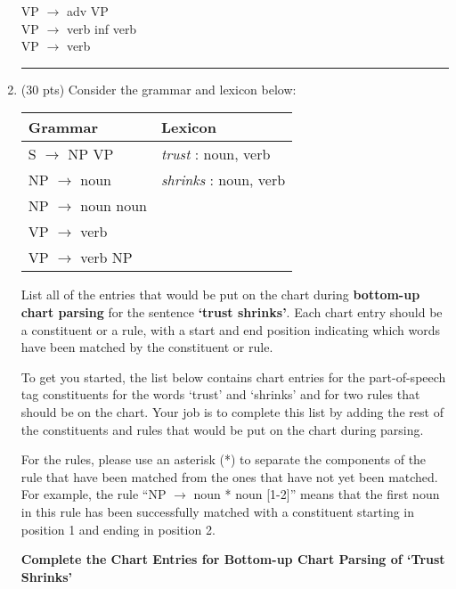 \documentclass[11pt]{article}
\begin{document}
\begin{enumerate}
VP $\rightarrow$ adv VP\\
VP $\rightarrow$  verb inf verb\\
VP $\rightarrow$  verb\\

\hrule

\item (30 pts) Consider the grammar and lexicon below:

\begin{center}
\begin{tabular}{|ll|} \hline
\textbf{Grammar} & \textbf{Lexicon} \\  \hline
S $\rightarrow$ NP VP & {\it trust} : noun, verb \\
NP $\rightarrow$ noun & {\it shrinks} :  noun, verb \\
NP $\rightarrow$ noun noun  & ~ \\
VP $\rightarrow$ verb & ~ \\
VP $\rightarrow$ verb NP & ~ \\  \hline
\end{tabular}
\end{center}

\vspace*{.1in} List all of the entries that would be put on the chart during
{\bf bottom-up chart parsing} for the sentence {\bf `trust shrinks'}.
Each chart entry should be a constituent or a rule, with a start
and end position indicating which words have been matched by the
constituent or rule.

To get you started, the list below contains chart entries for the
part-of-speech tag constituents for the words `trust' and `shrinks'
and for two rules that should be on the chart. Your job is to complete
this list by adding the rest of the constituents and rules that would
be put on the chart during parsing.

For the rules, please use an asterisk (*) to separate the components
of the rule that have been matched from the ones that have not yet been
matched. For example, the rule ``NP $\rightarrow$ noun * noun [1-2]'' means that
 the first noun in this rule has been successfully matched with a
 constituent starting in position 1 and ending in position 2. \\




\begin{center}
{\bf Complete the Chart Entries for Bottom-up Chart Parsing of `Trust Shrinks'} 
\end{center}


\end{enumerate}
\end{document}
